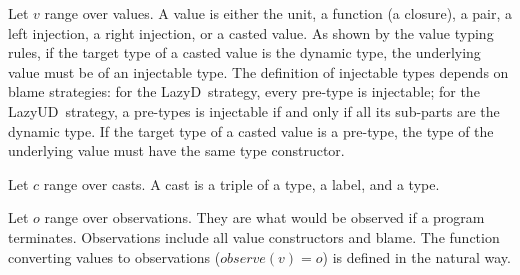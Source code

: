 \documentclass[acmsmall,review,anonymous]{acmart}\settopmatter{printfolios=true,printccs=false,printacmref=false}
\newcommand{\lazyUD}{Lazy\;UD}
\newcommand{\lazyD}{Lazy\;D}
\begin{document}
Let $v$ range over values. A value is either the unit, a function (a
closure), a pair, a left injection, a right injection, or a casted
value. As shown by the value typing rules, if the target type of a
casted value is the dynamic type, the underlying value must be of an
injectable type. The definition of injectable types depends on blame
strategies: for the \lazyD\ strategy, every pre-type is injectable;
for the \lazyUD\ strategy, a pre-types is injectable if and only if
all its sub-parts are the dynamic type. If the target type of a casted
value is a pre-type, the type of the underlying value must have the
same type constructor.

Let $c$ range over casts. A cast is a triple of a type, a label, and a type.

Let $o$ range over observations. They are what would be observed if
a program terminates. Observations include all value constructors and
blame.  The function converting values to observations ($observe(v) =
o$) is defined in the natural way.
\end{document}
